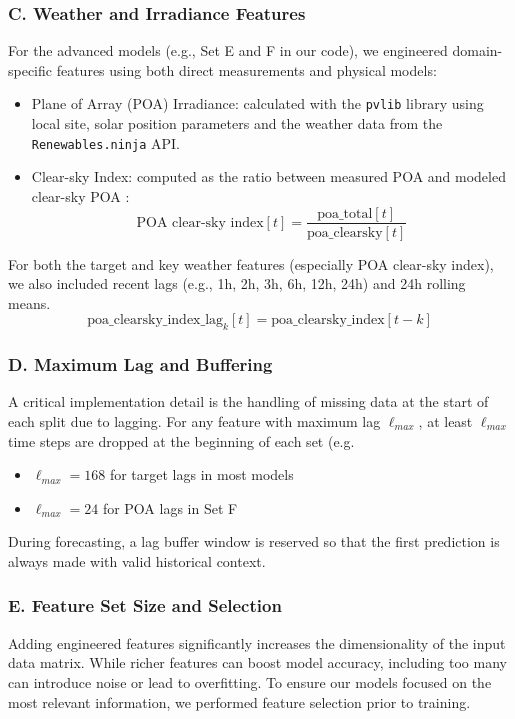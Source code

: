 \subsubsection*{C. Weather and Irradiance Features}
For the advanced models (e.g., Set E and F in our code), we engineered domain-specific 
features using both direct measurements and physical models:
\begin{itemize}
    \item Plane of Array (POA) Irradiance: calculated with the \texttt{pvlib} library using 
    local site, solar position parameters and the weather data from the 
    \texttt{Renewables.ninja} API.
    \item Clear-sky Index: computed as the ratio between measured POA and modeled 
    clear-sky POA :
    \[
    \text{POA clear-sky index}[t] = \frac{\text{poa\_total}[t]}{\text{poa\_clearsky}[t]}
    \]
\end{itemize}  
For both the target and key weather features (especially POA clear-sky index), we also 
included recent lags (e.g., 1h, 2h, 3h, 6h, 12h, 24h) and 24h rolling means.
\[
\text{poa\_clearsky\_index\_lag}_k[t] = \text{poa\_clearsky\_index}[t-k]
\]

\subsubsection*{D. Maximum Lag and Buffering}
A critical implementation detail is the handling of missing data at the start of each 
split due to lagging. For any feature with maximum lag $\ell_{max}$, at least 
$\ell_{max}$ time steps are dropped at the beginning of each set (e.g.
\vspace{-0.4cm}
\begin{itemize}
    \item $\ell_{max}=168$ for target lags in most models 
    \item $\ell_{max}=24$ for POA lags in Set F 
\end{itemize}
\vspace{-0.4cm}
During forecasting, a lag buffer window is reserved so that the first prediction is always 
made with valid historical context.

\subsubsection*{E. Feature Set Size and Selection}
Adding engineered features significantly increases the dimensionality of the input 
data matrix. While richer features can boost model accuracy, including too many can 
introduce noise or lead to overfitting. To ensure our models focused on the most 
relevant information, we performed feature selection prior to training.


